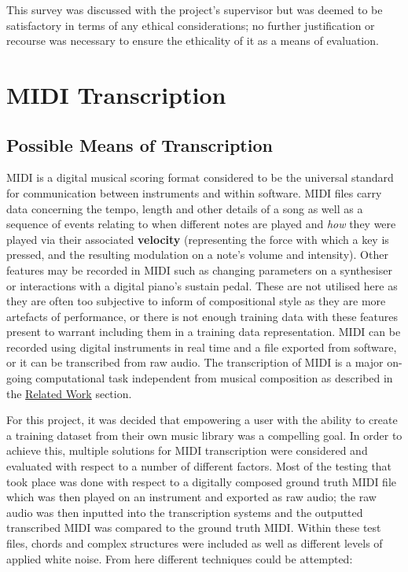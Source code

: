 \documentclass[12pt,]{article}
\begin{document}
This survey was discussed with the project's supervisor but was deemed
to be satisfactory in terms of any ethical considerations; no further
justification or recourse was necessary to ensure the ethicality of it
as a means of evaluation.

\hypertarget{midi-transcription}{%
\section{MIDI Transcription}\label{midi-transcription}}

\hypertarget{possible-means-of-transcription}{%
\subsection{Possible Means of
Transcription}\label{possible-means-of-transcription}}

MIDI is a digital musical scoring format considered to be the universal
standard for communication between instruments and within software. MIDI
files carry data concerning the tempo, length and other details of a
song as well as a sequence of events relating to when different notes
are played and \emph{how} they were played via their associated
\textbf{velocity} (representing the force with which a key is pressed,
and the resulting modulation on a note's volume and intensity). Other
features may be recorded in MIDI such as changing parameters on a
synthesiser or interactions with a digital piano's sustain pedal. These
are not utilised here as they are often too subjective to inform of
compositional style as they are more artefacts of performance, or there
is not enough training data with these features present to warrant
including them in a training data representation. MIDI can be recorded
using digital instruments in real time and a file exported from
software, or it can be transcribed from raw audio. The transcription of
MIDI is a major on-going computational task independent from musical
composition as described in the \protect\hyperlink{relatedwork}{Related
Work} section.

For this project, it was decided that empowering a user with the ability
to create a training dataset from their own music library was a
compelling goal. In order to achieve this, multiple solutions for MIDI
transcription were considered and evaluated with respect to a number of
different factors. Most of the testing that took place was done with
respect to a digitally composed ground truth MIDI file which was then
played on an instrument and exported as raw audio; the raw audio was
then inputted into the transcription systems and the outputted
transcribed MIDI was compared to the ground truth MIDI. Within these
test files, chords and complex structures were included as well as
different levels of applied white noise. From here different techniques
could be attempted:
\end{document}
